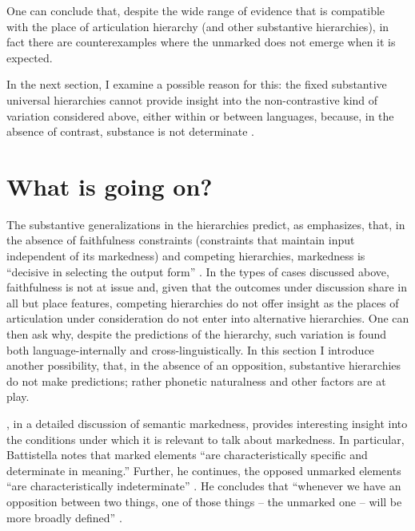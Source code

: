 \documentclass[output=paper]{langsci/langscibook}
\begin{document}
One can conclude that, despite the wide range of evidence that is compatible with the place of articulation hierarchy (and other substantive hierarchies), in fact there are counterexamples where the unmarked does not emerge when it is expected. 

In the next section, I examine a possible reason for this: the fixed substantive universal hierarchies cannot provide insight into the non-contrastive kind of variation considered above, either within or between languages, because, in the absence of contrast, substance is not determinate \citep[see, for instance,][]{Rice2007,Rice2009,Hall2011}.

\section{What is going on?} \label{sec:what?}

  The substantive generalizations in the hierarchies predict, as \citet{DeLacy2006} emphasizes, that, in the absence of faithfulness constraints (constraints that maintain input independent of its markedness) and competing hierarchies, markedness is “decisive in selecting the output form” \citep[110]{DeLacy2006}. In the types of cases discussed above, faithfulness is not at issue and, given that the outcomes under discussion share in all but place features, competing hierarchies do not offer insight as the places of articulation under consideration do not enter into alternative hierarchies. One can then ask why, despite the predictions of the hierarchy, such variation is found both language-internally and cross-linguistically. In this section I introduce another possibility, that, in the absence of an opposition, substantive hierarchies do not make predictions; rather phonetic naturalness and other factors are at play.

 \citet{Battistella1990}, in a detailed discussion of semantic markedness, provides interesting insight into the conditions under which it is relevant to talk about markedness. In particular, Battistella notes that marked elements “are characteristically specific and determinate in meaning.” Further, he continues, the opposed unmarked elements “are characteristically indeterminate” \citep[27]{Battistella1990}. He concludes that “whenever we have an opposition between two things, one of those things – the unmarked one – will be more broadly defined” \citep[4]{Battistella1990}.
\end{document}
